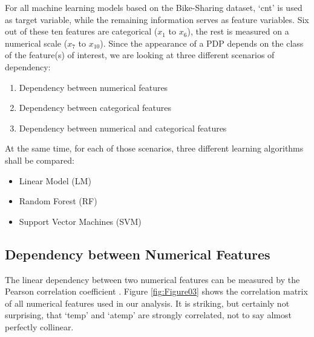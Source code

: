 \documentclass[]{krantz}
\providecommand{\tightlist}{%
  \setlength{\itemsep}{0pt}\setlength{\parskip}{0pt}}
\begin{document}
For all machine learning models based on the Bike-Sharing dataset, `cnt'
is used as target variable, while the remaining information serves as
feature variables. Six out of these ten features are categorical
(\(x_1\) to \(x_6\)), the rest is measured on a numerical scale (\(x_7\)
to \(x_{10}\)). Since the appearance of a PDP depends on the class of
the feature(s) of interest, we are looking at three different scenarios
of dependency:

\begin{enumerate}
\def\labelenumi{\arabic{enumi}.}
\tightlist
\item
  Dependency between numerical features
\item
  Dependency between categorical features
\item
  Dependency between numerical and categorical features
\end{enumerate}

At the same time, for each of those scenarios, three different learning
algorithms shall be compared:

\begin{itemize}
\tightlist
\item
  Linear Model (LM)
\item
  Random Forest (RF)
\item
  Support Vector Machines (SVM)
\end{itemize}

\subsection{Dependency between Numerical
Features}\label{dependency-between-numerical-features}

The linear dependency between two numerical features can be measured by
the Pearson correlation coefficient \citep{fahrmeir2016statistik}.
Figure \ref{fig:Figure03} shows the correlation matrix of all numerical
features used in our analysis. It is striking, but certainly not
surprising, that `temp' and `atemp' are strongly correlated, not to say
almost perfectly collinear.
\end{document}
